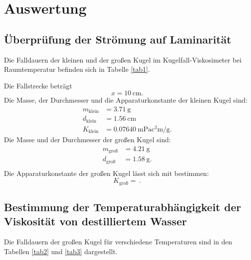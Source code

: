 \section{Auswertung}
\label{sec:Auswertung}

\subsection{Überprüfung der Strömung auf Laminarität} %
Die Falldauern der kleinen und der großen Kugel im Kugelfall-Viskosimeter
bei Raumtemperatur befinden sich in Tabelle \ref{tab1}.

\noindent Die Fallstrecke beträgt 
\begin{equation*}
    x = \SI{10}{\centi\meter}.
\end{equation*}
Die Masse, der Durchmesser und die Apparaturkonstante der kleinen Kugel sind:
\begin{align*}
    m_\text{klein} &= \SI{3.71}{\gram} \\
    d_\text{klein} &= \SI{1.56}{\centi\meter} \\
    K_\text{klein} &= \SI{0.07640}{\milli\pascal\cubic\centi\meter\per\gram}.
\end{align*}
Die Masse und der Durchmesser der großen Kugel sind:
\begin{align*}
    m_\text{groß} &= \SI{4.21}{\gram} \\
    d_\text{groß} &= \SI{1.58}{\gram}. \\
\end{align*}
Die Apparaturkonstante der großen Kugel lässt sich mit %
bestimmen:
\begin{equation*}
    K_\text{groß} = \SI{}{}.
\end{equation*}

\subsection{Bestimmung der Temperaturabhängigkeit der Viskosität von destilliertem Wasser}
Die Falldauern der großen Kugel für verschiedene Temperaturen sind in den Tabellen
\ref{tab2} und \ref{tab3} dargestellt.




